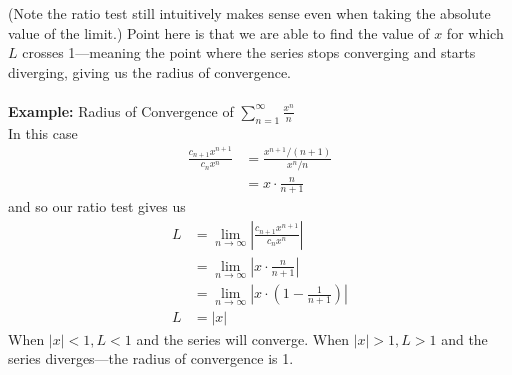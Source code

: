 \documentclass{report}
\begin{document}
(Note the ratio test still intuitively makes sense even when taking the absolute value of the limit.) Point here is that we are able 
to find the value of $x$ for which $L$ crosses 1---meaning the point where the series stops converging and starts diverging,
giving us the radius of convergence.\\
\vspace{1mm}\\
\textbf{Example:} Radius of Convergence of $\sum_{n=1}^\infty\frac{x^n}{n}$\\
In this case
\begin{align*}
\frac{c_{n+1}x^{n+1}}{c_{n}x^{n}}&=\frac{x^{n+1}/(n+1)}{x^n/n}\\
&=x\cdot\frac{n}{n+1}
\end{align*}
and so our ratio test gives us
\begin{align*}
L&=\lim_{n\to\infty}\left|\frac{c_{n+1}x^{n+1}}{c_{n}x^{n}}\right|\\
&=\lim_{n\to\infty}\left|x\cdot\frac{n}{n+1}\right|\\
&=\lim_{n\to\infty}\left|x\cdot\left(1-\frac{1}{n+1}\right)\right|\\
L&=|x|
\end{align*}
When $|x|<1,L<1$ and the series will converge. When $|x|>1,L>1$ and the series diverges---the radius of convergence is 1.
\newpage
\end{document}

